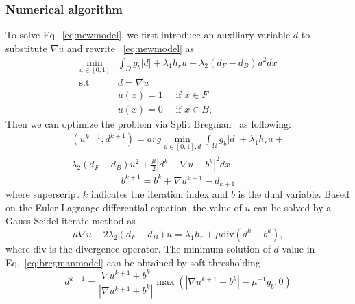 \documentclass{article}
\begin{document}
\subsubsection{Numerical algorithm}
To solve Eq.~\eqref{eq:newmodel}, we first introduce an auxiliary variable $d$ to substitute $\nabla u$ and rewrite ~\eqref{eq:newmodel} as
\begin{equation}\label{eq:rewrite of newmodel}
\begin{array}{rl}
   \underset{u\in[0,1]}{ \min}  & \int_\Omega{g_b|d|+\lambda_1h_ru+\lambda_2(d_F-d_B)u^2dx} \\
   \textrm{s.t} & d = \nabla u\\
& u(x) = 1 ~~~~~~ \textrm{if $x\in F$}\\
& u(x) = 0  ~~~~~~ \textrm{if $x\in B$},
\end{array}
\end{equation}
Then we can optimize the problem via Split Bregman~\cite{GoldsteinO09} as following:
\begin{equation} \label{eq:bregmanmodel}
\begin{aligned}
    (u^{k+1},d^{k+1})=arg \min_{u\in[0,1],d}\int_\Omega g_b|d|+\lambda_1h_ru+ \\
    \lambda_2(d_F-d_B)u^2+\frac{\mu}{2}|d^k-\nabla u-b^k|^2dx
\end{aligned}
\end{equation}
%
\begin{equation}
    b^{k+1}=b^k+\nabla u^{k+1}-d_{k+1}
\end{equation}
where superscript $k$ indicates the iteration index and $b$ is the dual variable. Based on the Euler-Lagrange differential equation, the value of $u$ can be solved by a Gauss-Seidel iterate method as
\begin{equation} \label{eq:GS}
    \mu\nabla u-2\lambda_2(d_F-d_B)u=\lambda_1h_r+\mu \mathbf{\mathrm{div}}(d^k-b^k),
\end{equation}
where $\mathbf{\mathrm{div}}$ is the divergence operator.
%
The minimum solution of $d$ value in Eq.~\eqref{eq:bregmanmodel} can be obtained by soft-thresholding
\begin{equation}
    d^{k+1}=\frac{\nabla u^{k+1}+b^k}{|\nabla u^{k+1}+b^k|}\max(|\nabla u^{k+1}+b^k|-\mu^{-1}g_b, 0)
\end{equation}
%
%
\end{document}
